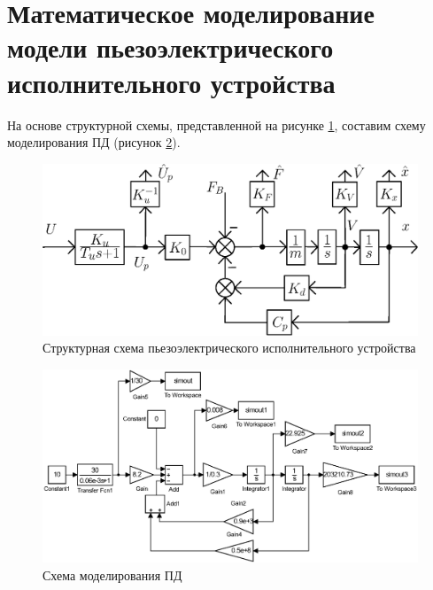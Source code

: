 \documentclass[12pt,a4paper]{article}
\begin{document}
\section{Математическое моделирование модели пьезоэлектрического исполнительного устройства}	 
На основе структурной схемы, представленной на рисунке \ref{structScheme}, составим схему моделирования ПД (рисунок \ref{cxema1}).
\begin{figure}[ht!]
	\centering
	\includegraphics[width = 0.8 \textwidth]{structScheme}
	\caption{Структурная схема пьезоэлектрического исполнительного устройства}
	\label{structScheme}
\end{figure}
\begin{figure}[ht!]
	\centering
	\includegraphics[width = \textwidth]{cxema1}
	\caption{Схема моделирования ПД}
	\label{cxema1}
\end{figure}
\end{document}
